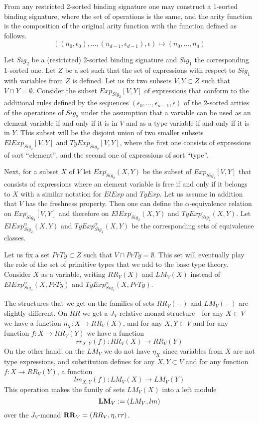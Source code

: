 \documentclass[12pt]{amsart}
\numberwithin{proposition}{subsection}
\newcommand{\sr}{\rightarrow}
\newcommand{\RR}{{\bf RR}}
\newcommand{\LM}{{\bf LM}}
\begin{document}
From any restricted 2-sorted binding signature one may construct a 1-sorted binding signature,
where the set of operations is the same, and the arity function is the
composition of the original arity function with the function defined as follows.
$$((n_0,\epsilon_0),\dots,(n_{d-1},\epsilon_{d-1}),\epsilon) \mapsto (n_0,\dots,n_d)$$

Let $Sig_2$ be a (restricted) 2-sorted binding signature and $Sig_1$ the
corresponding 1-sorted one. Let $Z$ be a set such that the set of expressions
with respect to $Sig_1$ with variables from $Z$ is defined. Let us fix two
subsets $V,Y\subset Z$ such that $V\cap Y=\emptyset$. Consider the subset
$Exp_{Sig_2}[V,Y]$ of expressions that conform to the additional rules defined
by the sequences $(\epsilon_0,\dots,\epsilon_{n-1},\epsilon)$ of the 2-sorted
arities of the operations of $Sig_2$ under the assumption that a variable can
be used as an element variable if and only if it is in $V$ and as a type
variable if and only if it is in $Y$. This subset will be the disjoint union of
two smaller subsets $ElExp_{Sig_2}[V,Y]$ and $TyExp_{Sig_2}[V,Y]$, where the
first one consists of expressions of sort ``element'', and the second one of
expressions of sort ``type''.

Next, for a subset $X$ of $V$ let $Exp^{\cdot}_{Sig_2}(X,Y)$ be the subset of
$Exp_{Sig_2}[V,Y]$ that consists of expressions where an element variable is
free if and only if it belongs to $X$ with a similar notation for $ElExp$ and
$TyExp$. Let us assume in addition that $V$ has the freshness property. Then
one can define the $\alpha$-equivalence relation on $Exp^{\cdot}_{Sig_2}[V,Y]$
and therefore on $ElExp^{\cdot}_{Sig_2}(X,Y)$ and
$TyExp^{\cdot}_{Sig_2}(X,Y)$. Let $ElExp^{\alpha}_{Sig_2}(X,Y)$ and
$TyExp_{Sig_2}^{\alpha}(X,Y)$ be the corresponding sets of equivalence classes.

Let us fix a set $PrTy\subset Z$ such that $V\cap PrTy=\emptyset$. This set
will eventually play the role of the set of primitive types that we add to the
base type theory. Consider $X$ as a variable, writing $RR_V(X)$ and $LM_V(X)$
instead of $ElExp^{\alpha}_{Sig_2}(X,PrTy)$ and
$TyExp_{Sig_2}^{\alpha}(X,PrTy)$.

The structures that we get on the families of sets $RR_V(-)$ and $LM_V(-)$ are
slightly different. On $RR$ we get a $J_V$-relative monad structure---for any
$X\subset V$ we have a function $\eta_X:X\sr RR_V(X)$, and for any $X,Y\subset V$
and for any function $f:X\sr RR_V(Y)$ we have a function
%
$$rr_{X,Y}(f):RR_V(X)\sr RR_V(Y)$$
%
On the other hand, on the $LM_V$ we do not have $\eta_X$ since variables from
$X$ are not type expressions, and substitution defines for any $X,Y\subset V$
and for any function $f:X\sr RR_V(Y)$, a function
%
$$lm_{X,Y}(f):LM_V(X)\sr LM_V(Y)$$
%
This operation makes the family of sets $LM_V(X)$ into a left module
$$\LM_V:=(LM_V, lm)$$ over the $J_V$-monad $\RR_V=(RR_V,\eta,rr)$.
\end{document}
